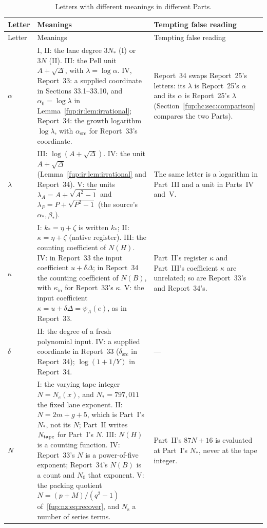 \documentclass[11pt,letterpaper]{article}
\theoremstyle{definition}\newtheorem{definition}[theorem]{Definition}
\theoremstyle{remark}\newtheorem{remark}[theorem]{Remark}
\newcommand{\asrc}{\alpha_{\mathrm{src}}}
\newcommand{\dsrc}{\delta_{\mathrm{src}}}
\newcommand{\kin}{\kappa_{\mathrm{in}}}
\begin{document}
{\small
\begin{longtable}{@{}p{}p{}p{}@{}}
\caption{Letters with different meanings in different Parts.}\label{fup:fm:tab:notation}\\
\toprule
Letter & Meanings & Tempting false reading\\\midrule\endfirsthead
\toprule
Letter & Meanings & Tempting false reading\\\midrule\endhead
$\alpha$ & I, II: the lane degree $3N_*$ (I) or $3N$ (II). III: the Pell unit $A+\sqrt\Delta$, with $\lambda=\log\alpha$. IV, Report~33: a supplied coordinate in Sections 33.1--33.10, and $\alpha_0=\log\lambda$ in Lemma~\ref{fup:ir:lem:irrational}; Report~34: the growth logarithm $\log\lambda$, with $\asrc$ for Report~33's coordinate. & Report~34 swaps Report~25's letters: its $\lambda$ is Report~25's $\alpha$ and its $\alpha$ is Report~25's $\lambda$ (Section~\ref{fup:hc:sec:comparison} compares the two Parts).\\
$\lambda$ & III: $\log(A+\sqrt\Delta)$. IV: the unit $A+\sqrt\Delta$ (Lemma~\ref{fup:ir:lem:irrational} and Report~34). V: the units $\lambda_A=A+\sqrt{A^2-1}$ and $\lambda_P=P+\sqrt{P^2-1}$ (the source's $\alpha_*,\beta_*$). & The same letter is a logarithm in Part~III and a unit in Parts~IV and~V.\\
$\kappa$ & I: $k_*=\eta+\zeta$ is written $k_*$; II: $\kappa=\eta+\zeta$ (native register). III: the counting coefficient of $N(H)$. IV: in Report~33 the input coefficient $u+\delta\Delta$; in Report~34 the counting coefficient of $N(B)$, with $\kin$ for Report~33's $\kappa$. V: the input coefficient $\kappa=u+\delta\Delta=\psi_A(e)$, as in Report~33. & Part~II's register $\kappa$ and Part~III's coefficient $\kappa$ are unrelated; so are Report~33's and Report~34's.\\
$\delta$ & II: the degree of a fresh polynomial input. IV: a supplied coordinate in Report~33 ($\dsrc$ in Report~34); $\log(1+1/Y)$ in Report~34. & ---\\
$N$ & I: the varying tape integer $N=N_e(x)$, and $N_*=797{,}011$ the fixed lane exponent. II: $N=2m+g+5$, which is Part~I's $N_*$, not its $N$; Part~II writes $N_{\rm tape}$ for Part~I's $N$. III: $N(H)$ is a counting function. IV: Report~33's $N$ is a power-of-five exponent; Report~34's $N(B)$ is a count and $N_0$ that exponent. V: the packing quotient $N=(p+M)/(q^2-1)$ of~\eqref{fup:nz:eq:recover}, and $N_{\mathrm s}$ a number of series terms. & Part~II's $87N+16$ is evaluated at Part~I's $N_*$, never at the tape integer.\\

\end{longtable}}
\end{document}

